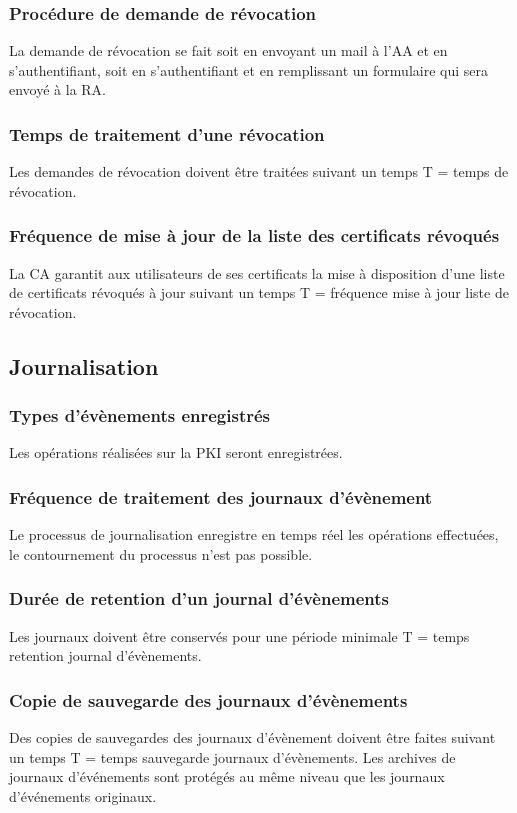 \documentclass[a4paper,11pt,french]{book}
\begin{document}
\subsubsection{Procédure de demande de révocation}
La demande de révocation se fait soit en envoyant un mail à l'AA et en s'authentifiant, soit en s'authentifiant et en remplissant un formulaire qui sera envoyé à la RA.

\subsubsection{Temps de traitement d'une révocation}
Les demandes de révocation doivent être traitées suivant un temps T = temps de révocation.

\subsubsection{Fréquence de mise à jour de la liste des certificats révoqués}
La CA garantit aux utilisateurs de ses certificats la mise à disposition d'une liste de certificats révoqués à jour
suivant un temps T = fréquence mise à jour liste de révocation.

\subsection{Journalisation}
\subsubsection{Types d'évènements enregistrés}
Les opérations réalisées sur la PKI seront enregistrées.

\subsubsection{Fréquence de traitement des journaux d'évènement}
Le processus de journalisation enregistre en temps réel les opérations effectuées, le contournement du processus n'est pas possible.

\subsubsection{Durée de retention d'un journal d'évènements}
Les journaux doivent être conservés pour une période
minimale T = temps retention journal d'évènements.

\subsubsection{Copie de sauvegarde des journaux d'évènements}
Des copies de sauvegardes des journaux d'évènement doivent être faites suivant un temps T = temps sauvegarde journaux d'évènements. Les archives de journaux d'événements sont protégés au même niveau que les journaux d'événements originaux.
\end{document}
